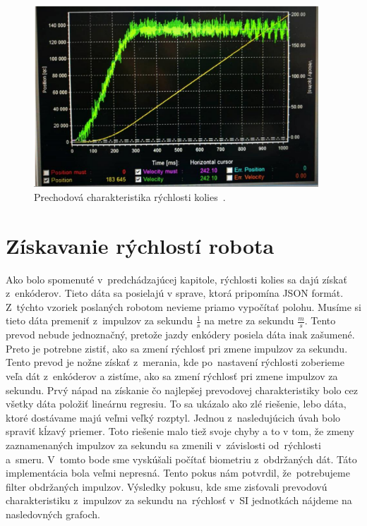 \begin{figure}[!htbp]
	\begin{center}
		\includegraphics[width=0.95\textwidth]{img/robotSpeedChar.png}
	\end{center}
	\caption{Prechodová charakteristika rýchlosti kolies~\cite{timovyProjekt}. }
	\label{fig:prechChar}
\end{figure}

\clearpage

\section{Získavanie rýchlostí robota}
\label{sec:ziskavanieRychlosti}

Ako bolo spomenuté v~predchádzajúcej kapitole, rýchlosti kolies sa dajú získať z~enkóderov. Tieto dáta sa posielajú v sprave, ktorá pripomína JSON formát.
Z~týchto vzoriek poslaných robotom nevieme priamo vypočítať polohu. Musíme si tieto dáta premeniť z~impulzov za sekundu \(\frac{1}{s}\) na metre
za sekundu \(\frac{m}{s}\). Tento prevod nebude jednoznačný, pretože jazdy enkódery posiela dáta inak zašumené. Preto je potrebne zistiť, ako sa zmení
rýchlosť pri zmene impulzov za sekundu. Tento prevod je nožne získať z~merania, kde po~nastavení rýchlosti zoberieme veľa dát z~enkóderov a zistíme,
ako sa zmení rýchlosť pri zmene impulzov za sekundu. Prvý nápad na získanie čo najlepšej prevodovej charakteristiky bolo cez všetky dáta položiť
lineárnu regresiu. To sa ukázalo ako zlé riešenie, lebo dáta, ktoré dostávame majú veľmi veľký rozptyl. Jednou z~nasledujúcich úvah bolo spraviť
kĺzavý priemer. Toto riešenie malo tiež svoje chyby a to v tom, že zmeny zaznamenaných impulzov za sekundu sa zmenili v~závislosti od~rýchlosti a~smeru.
V~tomto bode sme vyskúšali počítať biometriu z~obdržaných dát. Táto implementácia bola veľmi nepresná. Tento pokus nám potvrdil, že~potrebujeme filter
obdržaných impulzov. Výsledky pokusu, kde sme zisťovali prevodovú charakteristiku z~impulzov za sekundu na~rýchlosť v~SI jednotkách nájdeme
na nasledovných grafoch.

